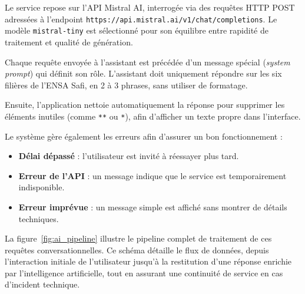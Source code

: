 \documentclass[a4paper,12pt]{article}
\begin{document}
Le service repose sur l'API Mistral AI, interrogée via des requêtes HTTP POST
adressées à l'endpoint \texttt{https://api.mistral.ai/v1/chat/completions}.
Le modèle \texttt{mistral-tiny} est sélectionné pour son équilibre entre rapidité
de traitement et qualité de génération. 

Chaque requête envoyée à l’assistant est précédée d’un message spécial (\textit{system prompt}) qui définit son rôle. L’assistant doit uniquement répondre sur les six filières de l’ENSA Safi, en 2 à 3 phrases, sans utiliser de formatage.

Ensuite, l’application nettoie automatiquement la réponse pour supprimer les éléments inutiles (comme \texttt{**} ou \texttt{*}), afin d’afficher un texte propre dans l’interface.

Le système gère également les erreurs afin d’assurer un bon fonctionnement :
\begin{itemize}
    \item \textbf{Délai dépassé} : l’utilisateur est invité à réessayer plus tard.
    \item \textbf{Erreur de l’API} : un message indique que le service est temporairement indisponible.
    \item \textbf{Erreur imprévue} : un message simple est affiché sans montrer de détails techniques.
\end{itemize}
La figure~\ref{fig:ai_pipeline} illustre le pipeline complet de traitement de ces requêtes conversationnelles. Ce schéma détaille le flux de données, depuis l'interaction initiale de l'utilisateur jusqu'à la restitution d'une réponse enrichie par l'intelligence artificielle, tout en assurant une continuité de service en cas d'incident technique.
\end{document}

